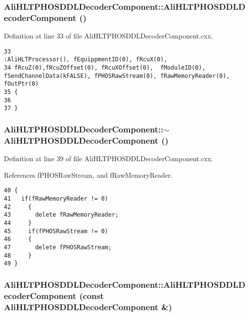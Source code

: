 \subsubsection{\setlength{\rightskip}{0pt plus 5cm}Ali\-HLTPHOSDDLDecoder\-Component::Ali\-HLTPHOSDDLDecoder\-Component ()}\label{classAliHLTPHOSDDLDecoderComponent_a0}




Definition at line 33 of file Ali\-HLTPHOSDDLDecoder\-Component.cxx.

\footnotesize\begin{verbatim}33                                                             :AliHLTProcessor(), fEquippmentID(0), fRcuX(0), 
34 fRcuZ(0),fRcuZOffset(0), fRcuXOffset(0),  fModuleID(0), fSendChannelData(kFALSE), fPHOSRawStream(0), fRawMemoryReader(0), fOutPtr(0)
35 {
36 
37 } 
\end{verbatim}\normalsize 


\subsubsection{\setlength{\rightskip}{0pt plus 5cm}Ali\-HLTPHOSDDLDecoder\-Component::$\sim${\bf Ali\-HLTPHOSDDLDecoder\-Component} ()\hspace{0.3cm}{\tt  [virtual]}}\label{classAliHLTPHOSDDLDecoderComponent_a1}




Definition at line 39 of file Ali\-HLTPHOSDDLDecoder\-Component.cxx.

References f\-PHOSRaw\-Stream, and f\-Raw\-Memory\-Reader.

\footnotesize\begin{verbatim}40 {
41   if(fRawMemoryReader != 0)
42     {
43       delete fRawMemoryReader;
44     }
45     if(fPHOSRawStream != 0)
46     {
47       delete fPHOSRawStream;
48     }
49 }
\end{verbatim}\normalsize 


\subsubsection{\setlength{\rightskip}{0pt plus 5cm}Ali\-HLTPHOSDDLDecoder\-Component::Ali\-HLTPHOSDDLDecoder\-Component (const {\bf Ali\-HLTPHOSDDLDecoder\-Component} \&)}\label{classAliHLTPHOSDDLDecoderComponent_a2}




